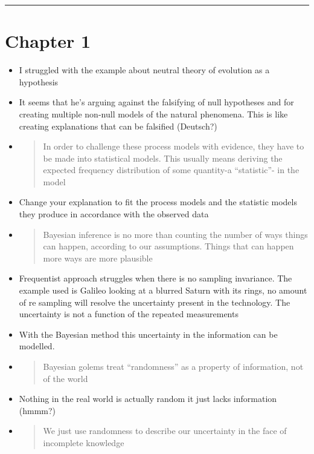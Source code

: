 \documentclass[11pt]{article}
\begin{document}
\begin{center}\rule{0.5\linewidth}{\linethickness}\end{center}

\hypertarget{chapter-1}{%
\section{Chapter 1}\label{chapter-1}}

\begin{itemize}
\item
  I struggled with the example about neutral theory of evolution as a
  hypothesis
\item
  It seems that he's arguing against the falsifying of null hypotheses
  and for creating multiple non-null models of the natural phenomena.
  This is like creating explanations that can be falsified (Deutsch?)
\item
  \begin{quote}
  In order to challenge these process models with evidence, they have to
  be made into statistical models. This usually means deriving the
  expected frequency distribution of some quantity-a ``statistic''- in
  the model
  \end{quote}
\item
  Change your explanation to fit the process models and the statistic
  models they produce in accordance with the observed data
\item
  \begin{quote}
  Bayesian inference is no more than counting the number of ways things
  can happen, according to our assumptions. Things that can happen more
  ways are more plausible
  \end{quote}
\item
  Frequentist approach struggles when there is no sampling invariance.
  The example used is Galileo looking at a blurred Saturn with its
  rings, no amount of re sampling will resolve the uncertainty present
  in the technology. The uncertainty is not a function of the repeated
  measurements
\item
  With the Bayesian method this uncertainty in the information can be
  modelled.
\item
  \begin{quote}
  Bayesian golems treat ``randomness'' as a property of information, not
  of the world
  \end{quote}
\item
  Nothing in the real world is actually random it just lacks information
  (hmmm?)
\item
  \begin{quote}
  We just use randomness to describe our uncertainty in the face of
  incomplete knowledge
  \end{quote}
\end{itemize}
\end{document}
